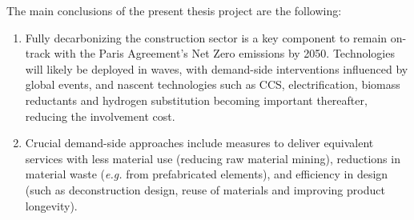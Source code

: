 The main conclusions of the present thesis project are the following:

\begin{enumerate}
\item Fully decarbonizing the construction sector is a key component to remain on-track with the Paris Agreement’s Net Zero emissions by 2050. Technologies will likely be deployed in waves, with demand-side interventions influenced by global events, and nascent technologies such as CCS, electrification, biomass reductants and hydrogen substitution becoming important thereafter, reducing the involvement cost.
\item Crucial demand-side approaches include measures to deliver equivalent services with less material use (reducing raw material mining), reductions in material waste (\textit{e.g.} from prefabricated elements), and efficiency in design (such as deconstruction design, reuse of materials and improving product longevity).
\end{enumerate}

